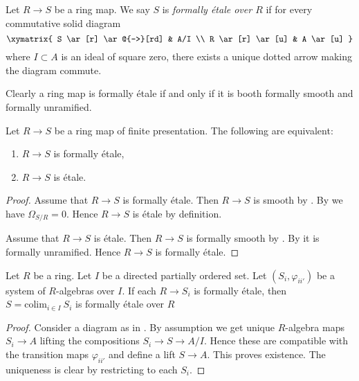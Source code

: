 \begin{definition}
\label{definition-formally-etale}
Let $R \to S$ be a ring map.
We say $S$ is {\it formally \'etale over $R$} if for every
commutative solid diagram
$$
\xymatrix{
S \ar[r] \ar@{-->}[rd] & A/I \\
R \ar[r] \ar[u] & A \ar[u]
}
$$
where $I \subset A$ is an ideal of square zero, there exists
a unique dotted arrow making the diagram commute.
\end{definition}

\noindent
Clearly a ring map is formally \'etale if and only if
it is booth formally smooth and formally unramified.

\begin{lemma}
\label{lemma-formally-etale-etale}
Let $R \to S$ be a ring map of finite presentation.
The following are equivalent:
\begin{enumerate}
\item $R \to S$ is formally \'etale,
\item $R \to S$ is \'etale.
\end{enumerate}
\end{lemma}

\begin{proof}
Assume that $R \to S$ is formally \'etale.
Then $R \to S$ is smooth by .
By 
we have $\Omega_{S/R} = 0$.
Hence $R \to S$ is \'etale by definition.

\medskip\noindent
Assume that $R \to S$ is \'etale.
Then $R \to S$ is formally smooth by
.
By 
it is formally unramified. Hence $R \to S$ is formally \'etale.
\end{proof}

\begin{lemma}
\label{lemma-colimit-formally-etale}
Let $R$ be a ring. Let $I$ be a directed partially ordered set.
Let $(S_i, \varphi_{ii'})$ be a system of $R$-algebras
over $I$. If each $R \to S_i$ is formally \'etale, then
$S = \text{colim}_{i \in I}\ S_i$ is formally \'etale over $R$
\end{lemma}

\begin{proof}
Consider a diagram as in .
By assumption we get unique $R$-algebra maps $S_i \to A$ lifting
the compositions $S_i \to S \to A/I$. Hence these are compatible
with the transition maps $\varphi_{ii'}$ and define a lift
$S \to A$. This proves existence.
The uniqueness is clear by restricting to each $S_i$.
\end{proof}

